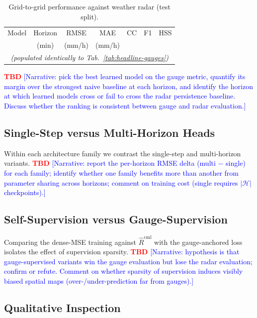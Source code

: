 \documentclass[conference]{IEEEtran}
\newcommand{\tbd}{\textcolor{red}{\textbf{TBD}}}
\newcommand{\note}[1]{\textcolor{blue}{[#1]}}
\begin{document}
\begin{table}[t]
\centering
\caption{Grid-to-grid performance against weather radar (test split).}
\label{tab:headline-radar}
\begin{tabular}{l c c c c c c}
\toprule
Model & Horizon & RMSE & MAE & CC & F1 & HSS \\
      & (min)   & (mm/h) & (mm/h) & & & \\
\midrule
\multicolumn{7}{c}{\emph{(populated identically to Tab.~\ref{tab:headline-gauges})}}\\
\bottomrule
\end{tabular}
\end{table}

\noindent\tbd{} \note{Narrative: pick the best learned model on the
gauge metric, quantify its margin over the strongest naive baseline at
each horizon, and identify the horizon at which learned models cross or
fail to cross the radar persistence baseline. Discuss whether the
ranking is consistent between gauge and radar evaluation.}

\subsection{Single-Step versus Multi-Horizon Heads}

Within each architecture family we contrast the single-step and
multi-horizon variants. \tbd{} \note{Narrative: report the
per-horizon RMSE delta (multi $-$ single) for each family; identify
whether one family benefits more than another from parameter sharing
across horizons; comment on training cost (single requires
$|\mathcal{H}|$ checkpoints).}

\subsection{Self-Supervision versus Gauge-Supervision}

Comparing the dense-MSE training against $\widehat{R}^{\mathrm{cml}}$
with the gauge-anchored loss isolates the effect of supervision
sparsity. \tbd{} \note{Narrative: hypothesis is that gauge-supervised
variants win the gauge evaluation but lose the radar evaluation; confirm
or refute. Comment on whether sparsity of supervision induces
visibly biased spatial maps (over-/under-prediction far from gauges).}

\subsection{Qualitative Inspection}
\end{document}
